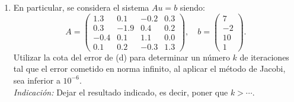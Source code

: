 {\begin{enumerate}[label=\alph*)]
  \item En particular, se considera el sistema $Au = b$ siendo:
  \begin{equation*}
  A = \begin{pmatrix}
  1.3 & 0.1 & -0.2 & 0.3 \\
  0.3 & -1.9 & 0.4 & 0.2 \\
  -0.4 & 0.1 & 1.1 & 0.0 \\
  0.1 & 0.2 & -0.3 & 1.3
  \end{pmatrix}, \quad b = \begin{pmatrix} 7 \\ -2 \\ 10 \\ 1 \end{pmatrix}.
  \end{equation*}
  Utilizar la cota del error de (d) para determinar un número $k$ de iteraciones tal que el error cometido en norma infinito, al aplicar el método de Jacobi, sea inferior a $10^{-6}$. \\
  \textit{Indicación:} Dejar el resultado indicado, es decir, poner que $k > \cdots$.
\end{enumerate}
}{%
%
}

